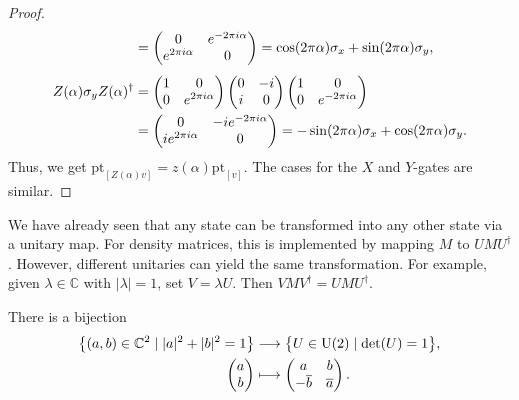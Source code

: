 \documentclass[a4paper, oneside, 12pt]{amsart}
\begin{document}
\begin{proof}
\begin{align*}
    & =
      \begin{pmatrix}
        0 & e^{-2\pi i \alpha} \\
        e^{2\pi i \alpha} & 0
      \end{pmatrix}
      =  \cos(2\pi \alpha) \sigma_x + \sin(2\pi \alpha) \sigma_y, \\[0.25\baselineskip]
    Z(\alpha) \sigma_y Z(\alpha)^\dagger
    & =
      \begin{pmatrix}
        1 & 0 \\
        0 & e^{2\pi i \alpha}
      \end{pmatrix}
      \begin{pmatrix}
        0 & -i \\
        i & 0
      \end{pmatrix}
      \begin{pmatrix}
        1 & 0 \\
        0 & e^{-2\pi i \alpha}
      \end{pmatrix}\\
    & =
      \begin{pmatrix}
        0 & -ie^{-2\pi i \alpha} \\
        ie^{2\pi i \alpha} & 0
      \end{pmatrix}
      = -\sin(2\pi \alpha) \sigma_x + \cos(2\pi \alpha) \sigma_y.
  \end{align*}
  Thus, we get \(\mathrm{pt}_{[Z(\alpha) v]} = z(\alpha)\mathrm{pt}_{[v]}\).
  The cases for the \(X\) and \(Y\)-gates are similar.
\end{proof}


We have already seen that any state can be transformed into any other state via a unitary map.
For density matrices, this is implemented by mapping \(M\) to \( U M U^{\dagger} \).
However, different unitaries can yield the same transformation.
For example, given \( \lambda \in \mathbb{C} \) with \( |\lambda| = 1 \), set \(V = \lambda U\).
Then \(V M V^{\dagger} = U M U^{\dagger}\).

\begin{lemma}\label{lem:standard-form-su2}
  There is a bijection
  \begin{equation}
    \begin{aligned}
      \big\{ (a, b) \in \mathbb{C}^2 \mid |a|^2 + |b|^2 = 1 \big\}
      & \longrightarrow \big\{ U \in \operatorname{U}(2) \mid \det(U) = 1 \big\}, \\
      \begin{pmatrix} a \\ b \end{pmatrix}
      & \longmapsto
        \begin{pmatrix}
          a & b \\
          -\overline{b} & \overline{a}
        \end{pmatrix}.
    \end{aligned}
  \end{equation}
\end{lemma}
\end{document}
